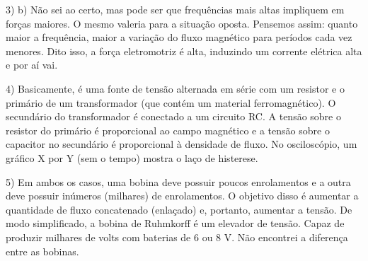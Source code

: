 \documentclass[12pt, a4paper, notitlepage]{article}
\begin{document}
        3) b) Não sei ao certo, mas pode ser que frequências mais altas impliquem em forças maiores. O mesmo valeria para a situação oposta. Pensemos assim: quanto maior a frequência, maior a variação do fluxo magnético para períodos cada vez menores. Dito isso, a força eletromotriz é alta, induzindo um corrente elétrica alta e por aí vai.
        
        4) Basicamente, é uma fonte de tensão alternada em série com um resistor e o primário de um transformador (que contém um material ferromagnético). O secundário do transformador é conectado a um circuito RC. A tensão sobre o resistor do primário é proporcional ao campo magnético e a tensão sobre o capacitor no secundário é proporcional à densidade de fluxo. No osciloscópio, um gráfico X por Y (sem o tempo) mostra o laço de histerese.
        
        5) Em ambos os casos, uma bobina deve possuir poucos enrolamentos e a outra deve possuir inúmeros (milhares) de enrolamentos. O objetivo disso é aumentar a quantidade de fluxo concatenado (enlaçado) e, portanto, aumentar a tensão. De modo simplificado, a bobina de Ruhmkorff é um elevador de tensão. Capaz de produzir milhares de volts com baterias de 6 ou 8 V. Não encontrei a diferença entre as bobinas.
\end{document}

